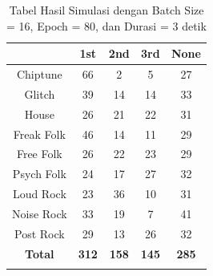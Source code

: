 \begin{longtable}[c]{|c|c|c|c|c|}
	\hline
	\textbf{}      & \textbf{1st} & \textbf{2nd} & \textbf{3rd} & \textbf{None} \\ \hline
	\endfirsthead
	\endhead
	Chiptune       & 66           & 2            & 5            & 27            \\ \hline
	Glitch         & 39           & 14           & 14           & 33            \\ \hline
	House          & 26           & 21           & 22           & 31            \\ \hline
	Freak Folk     & 46           & 14           & 11           & 29            \\ \hline
	Free Folk      & 26           & 22           & 23           & 29            \\ \hline
	Psych Folk     & 24           & 17           & 27           & 32            \\ \hline
	Loud Rock      & 23           & 36           & 10           & 31            \\ \hline
	Noise Rock     & 33           & 19           & 7            & 41            \\ \hline
	Post Rock      & 29           & 13           & 26           & 32            \\ \hline
	\textbf{Total} & \textbf{312} & \textbf{158} & \textbf{145} & \textbf{285}  \\ \hline
	\caption{Tabel Hasil Simulasi dengan Batch Size = 16, Epoch = 80, dan Durasi = 3 detik}
	\label{tab:my-table}\\
\end{longtable}

